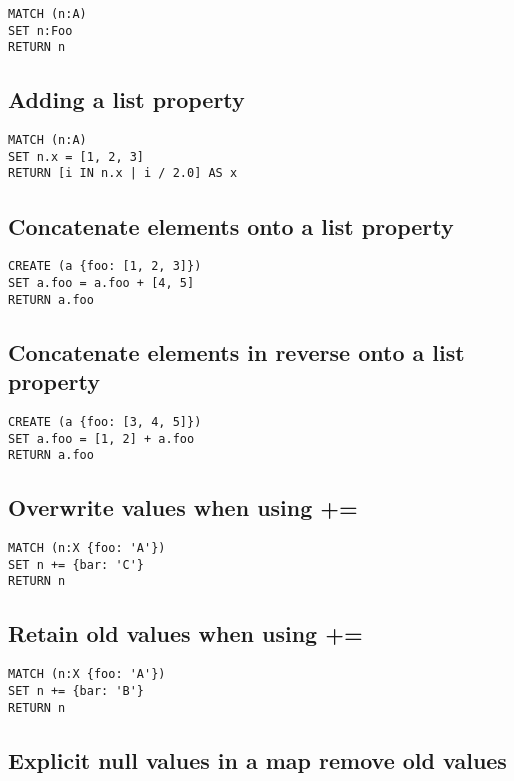 \begin{lstlisting}
MATCH (n:A)
SET n:Foo
RETURN n
\end{lstlisting}

\subsection{Adding a list property}

\begin{lstlisting}
MATCH (n:A)
SET n.x = [1, 2, 3]
RETURN [i IN n.x | i / 2.0] AS x
\end{lstlisting}

\subsection{Concatenate elements onto a list property}

\begin{lstlisting}
CREATE (a {foo: [1, 2, 3]})
SET a.foo = a.foo + [4, 5]
RETURN a.foo
\end{lstlisting}

\subsection{Concatenate elements in reverse onto a list property}

\begin{lstlisting}
CREATE (a {foo: [3, 4, 5]})
SET a.foo = [1, 2] + a.foo
RETURN a.foo
\end{lstlisting}

\subsection{Overwrite values when using +=}

\begin{lstlisting}
MATCH (n:X {foo: 'A'})
SET n += {bar: 'C'}
RETURN n
\end{lstlisting}

\subsection{Retain old values when using +=}

\begin{lstlisting}
MATCH (n:X {foo: 'A'})
SET n += {bar: 'B'}
RETURN n
\end{lstlisting}

\subsection{Explicit null values in a map remove old values}

